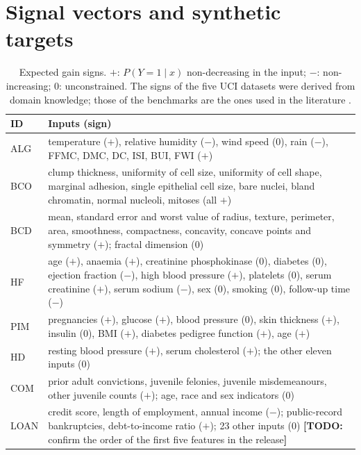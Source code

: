 \documentclass[11pt,a4paper]{article}
\newcommand{\todo}[1]{\textcolor{red!70!black}{\textbf{[TODO:} #1\textbf{]}}}
\begin{document}
\section{Signal vectors and synthetic targets}\label{sup:signals}
\begin{table}[H]\centering\small
\caption{Expected gain signs. $+$: $P(Y=1\mid x)$ non-decreasing in the input; $-$: non-increasing; $0$: unconstrained.
The signs of the five UCI datasets were derived from domain knowledge; those of the benchmarks are the ones used in the
literature \citep{Liu2020,Sivaraman2020,Runje2023}.}\label{tab:signals}
\begin{tabular}{lp{}}\toprule
ID & Inputs (sign) \\\midrule
ALG & temperature ($+$), relative humidity ($-$), wind speed (0), rain ($-$), FFMC, DMC, DC, ISI, BUI, FWI ($+$) \\
BCO & clump thickness, uniformity of cell size, uniformity of cell shape, marginal adhesion, single epithelial cell size,
bare nuclei, bland chromatin, normal nucleoli, mitoses (all $+$) \\
BCD & mean, standard error and worst value of radius, texture, perimeter, area, smoothness, compactness, concavity,
concave points and symmetry ($+$); fractal dimension (0) \\
HF & age ($+$), anaemia ($+$), creatinine phosphokinase (0), diabetes (0), ejection fraction ($-$), high blood pressure
($+$), platelets (0), serum creatinine ($+$), serum sodium ($-$), sex (0), smoking (0), follow-up time ($-$) \\
PIM & pregnancies ($+$), glucose ($+$), blood pressure (0), skin thickness ($+$), insulin (0), BMI ($+$), diabetes
pedigree function ($+$), age ($+$) \\
HD & resting blood pressure ($+$), serum cholesterol ($+$); the other eleven inputs (0) \\
COM & prior adult convictions, juvenile felonies, juvenile misdemeanours, other juvenile counts ($+$); age, race and sex
indicators (0) \\
LOAN & credit score, length of employment, annual income ($-$); public-record bankruptcies, debt-to-income ratio ($+$);
23 other inputs (0) \todo{confirm the order of the first five features in the release} \\
\bottomrule\end{tabular}
\end{table}
\end{document}
